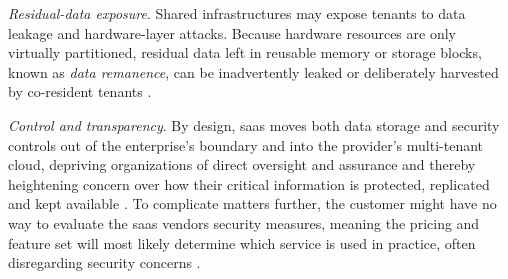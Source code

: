 \documentclass[11pt, a4paper, oneside, listof=totoc]{scrartcl}
\begin{document}
                \begin{enumerate}[label={[\arabic*]:},
                    ref=Challenge~\arabic*,
                    leftmargin=*,
                    itemsep=0.6\baselineskip]

                    \item\label{chal:remanence}
                        \textit{Residual-data exposure}.
                        Shared infrastructures may expose tenants to data leakage and hardware-layer
                        attacks. 
                        Because hardware resources are only virtually partitioned,
                        residual data left in reusable memory or storage blocks,
                        known as \textit{data remanence},
                        can be inadvertently leaked or deliberately harvested by co-resident tenants
                        \parencites[p.~586]{zissis2012}[pp.~344--345]{aljahdali2014}.

                    \item\label{chal:transparency}
                        \textit{Control and transparency}.
                        By design, \gls{saas} moves both data storage and security controls out of
                        the enterprise's boundary and into the provider's multi-tenant cloud,
                        depriving organizations of direct oversight and assurance and thereby
                        heightening concern over how their critical information is protected,
                        replicated and kept available \parencite[pp.~3--4]{subashini2011}.
                        To complicate matters further, the customer might have no way to evaluate
                        the \gls{saas} vendors security measures, meaning the pricing and feature
                        set will most likely determine which service is used in practice, often
                        disregarding security concerns
                        \parencites[p.~6]{everett2009}[p.~836]{khorshed2012}.


\end{enumerate}
\end{document}

